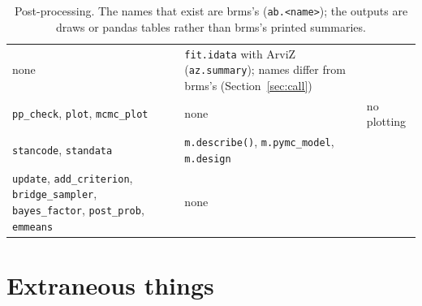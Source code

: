 \documentclass[11pt]{article}
\newcommand{\code}[1]{\texttt{#1}}
\begin{document}
\begin{table}[tbp]
\begin{center}
\begin{tabular}{@{}L{0.24\textwidth}L{0.34\textwidth}L{0.36\textwidth}@{}}
none & \code{fit.idata} with ArviZ (\code{az.summary}); names differ from brms's (Section~\ref{sec:call}) \\
\code{pp\_check}, \code{plot}, \code{mcmc\_plot} & none & no plotting \\
\code{stancode}, \code{standata} & \code{m.describe()}, \code{m.pymc\_model}, \code{m.design} & \\
\code{update}, \code{add\_criterion}, \code{bridge\_sampler}, \code{bayes\_factor}, \code{post\_prob}, \code{emmeans} & none
& \\
\bottomrule
\end{tabular}\end{center}
\caption{\small Post-processing. The names that exist are brms's (\code{ab.<name>}); the outputs are draws or pandas tables
rather than brms's printed summaries.}\label{tab:post}
\end{table}

\section{Extraneous things}\label{sec:extraneous}
\end{document}
